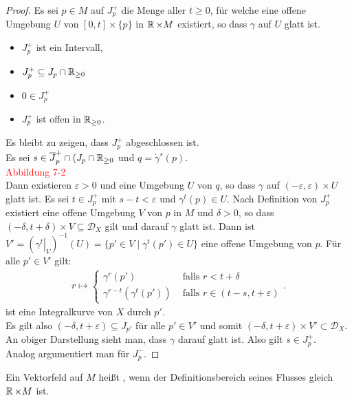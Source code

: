 \begin{proof}
  Es sei $p \in M$ auf $J_p^{+}$ die Menge aller $t \geq 0$, für welche eine offene Umgebung $U$ von $[0,t] \times \{p\}$ in $\operatorname{\mathbb{R}} \times M$ existiert, so dass $\gamma$ auf $U$ glatt ist.
  \begin{itemize}
  \item $J_p^{+}$ ist ein Intervall,
  \item $J_p^{+} \subseteq J_p \cap \operatorname{\mathbb{R}}_{\geq 0}$
  \item $0 \in J_p^{+}$
  \item $J_p^{+}$ ist offen in $\operatorname{\mathbb{R}}_{\geq 0}$.
  \end{itemize}
  Es bleibt zu zeigen, dass $J_p^{+}$ abgeschlossen ist.\\

  Es sei $s \in \overline J_p^{+} \cap (J_p \cap \operatorname{\mathbb{R}}_{\geq 0}$ und $q = \dot \gamma^s(p)$.\\
  \textcolor{red}{Abbildung 7-2}\\
  Dann existieren $\varepsilon > 0$ und eine Umgebung $U$ von $q$, so dass $\gamma$ auf $(-\varepsilon,\varepsilon) \times U$ glatt ist.
  Es sei $t \in J_p^{+}$ mit $s-t < \varepsilon$ und $\gamma^t(p) \in U$.
  Nach Definition von $J_p^{+}$ existiert eine offene Umgebung $V$ von $p$ in $M$ und $\delta > 0$, so dass $(-\delta,t+\delta)\times V \subseteq \mathcal D_X$ gilt und darauf $\gamma$ glatt ist.
  Dann ist $V' = \left(\left.\gamma^t\right|_V\right)^{-1}(U) = \{p' \in V \mid \gamma^t(p') \in U\}$ eine offene Umgebung von $p$.
  Für alle $p' \in V'$ gilt:
  \begin{align*}
    r \mapsto
    \begin{cases}
      \gamma^r(p') & \text{ falls } r < t+\delta\\
      \gamma^{r-t}(\gamma^t(p')) & \text{ falls } r \in (t-s,t+\varepsilon)
    \end{cases}.
  \end{align*}
  ist eine Integralkurve von $X$ durch $p'$.\\
  Es gilt also $(-\delta,t+\varepsilon) \subseteq J_{p'}$ für alle $p' \in V'$ und somit $(-\delta,t+\varepsilon) \times V' \subset \mathcal D_X$. An obiger Darstellung sieht man, dass $\gamma$ darauf glatt ist.
  Also gilt $s \in J_p^{+}$.\\
  Analog argumentiert man für $J_p^{-}$.
\end{proof}

\begin{dfn}
  Ein Vektorfeld auf $M$ heißt , wenn der Definitionsbereich seines Flusses gleich $\operatorname{\mathbb{R}} \times M$ ist.
\end{dfn}

